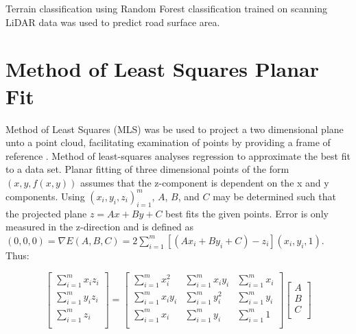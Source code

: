 \documentclass[numbered,pdftex]{ohio-etd}
\begin{document}
{{		{Terrain classification using Random Forest classification trained on scanning LiDAR data was used to predict road surface area.}
	
	
	} %
	
	\section{Method of Least Squares Planar Fit}{
	
		{Method of Least Squares (MLS) was be used to project a two dimensional plane unto a point cloud, facilitating examination of points by providing a frame of reference \cite{miller_method_nodate, gojcic_perfect_2019}. Method of least-squares analyses regression to approximate the best fit to a data set. Planar fitting of three dimensional points of the form $(x,y, f(x,y))$ assumes that the z-component is dependent on the x and y components. Using ${(x_i, y_i, z_i)}_{i=1}^m$, $A$, $B$, and $C$ may be determined such that the projected plane $z = Ax + By + C$ best fits the given points. Error is only measured in the z-direction and is defined as $(0,0,0) = \nabla E(A, B, C) = 2\sum_{i=1}^{m}[(Ax_i + By_i + C) - z_i](x_i,y_i,1)$. Thus:}
	
		\begin{equation}
			\left[ {\begin{array}{cc}
					\sum_{i=1}^{m} x_i z_i \\
					\sum_{i=1}^{m} y_i z_i \\
					\sum_{i=1}^{m} z_i \\
					
			\end{array} } \right]
			=
			\left[ {\begin{array}{ccc}
					\sum_{i=1}^{m} x_i^2 		& \sum_{i=1}^{m} x_i y_i 		& \sum_{i=1}^{m} x_i \\
					\sum_{i=1}^{m} x_i y_i 		& \sum_{i=1}^{m} y_i^2 			& \sum_{i=1}^{m} y_i \\
					\sum_{i=1}^{m} x_i 			& \sum_{i=1}^{m} y_i 			& \sum_{i=1}^{m} 1   \\
			\end{array} } \right]
			\left[ {\begin{array}{cc}
					A\\
					B\\
					C\\
			\end{array} } \right]
			\label{FOV}
		\end{equation}
	
}}
\end{document}
